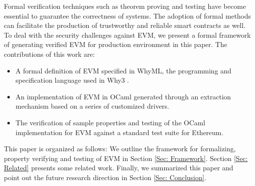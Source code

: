 \documentclass[runningheads]{llncs}
\begin{document}


Formal verification techniques such as theorem proving and testing have become essential to guarantee the correctness of systems. The adoption of formal methods can facilitate the production of trustworthy and reliable smart contracts as well. 
To deal with the security challenges against EVM, we present a formal framework of generating verified EVM for production environment in this paper. The contributions of this work are: 
\begin{itemize}
\item A formal definition of EVM specified in WhyML, the programming and specification language used in Why3 \cite{filliatre2013why3}. 
\item An implementation of EVM in OCaml generated through an extraction mechanism based on a series of customized drivers. 
\item The verification of sample properties and testing of the OCaml implementation for EVM against a standard test suite for Ethereum.
\end{itemize}

This paper is organized as follows: %
We outline the framework for formalizing, property verifying and testing of EVM in Section \ref{Sec: Framework}. %
Section \ref{Sec: Related} presents some related work. Finally, we summarized this paper and point out the future research direction in Section \ref{Sec: Conclusion}.
\end{document}

